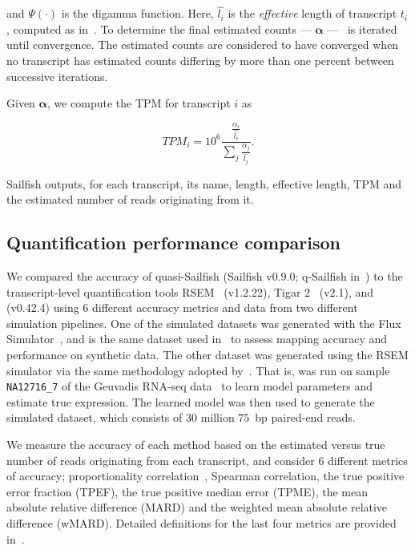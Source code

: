and $\Psi(\cdot)$ is the digamma function. Here, $\hat{l_i}$ is the \textit{effective} length of transcript $t_i$, computed as in~\citet{li2010rna}.  To determine the final estimated counts --- $\bm{\alpha}$ ---~ is iterated until convergence.  The estimated counts are considered to have converged when no transcript has estimated counts differing by more than one percent between successive iterations.

Given $\bm{\alpha}$, we compute the TPM for transcript $i$ as

\begin{equation}
  TPM_i = 10^6 \frac{\frac{\alpha_i}{\hat{l_i}}}{\sum_{j}\frac{\alpha_j}{\hat{l_j}}}.
\label{eqn:tpm}
\end{equation}

Sailfish outputs, for each transcript, its name, length, effective length, TPM and the estimated number of reads originating from it.

\subsection{Quantification performance comparison}
\label{subsec:quant_compare}

We compared the accuracy of quasi-Sailfish (Sailfish v0.9.0; q-Sailfish in~) to the transcript-level quantification tools RSEM~\citep{li2010rna} (v1.2.22), Tigar 2~\citep{tigar2} (v2.1), and \kallisto~\citep{Bray:2015:Kallisto} (v0.42.4) using 6 different accuracy metrics and data from two different simulation pipelines. One of the simulated datasets was generated with the Flux Simulator~\citep{fluxsim}, and is the same dataset used in~ to assess mapping accuracy and performance on synthetic data.  The other dataset was generated using the RSEM simulator via the same methodology adopted by~\citet{Bray:2015:Kallisto}.  That is,  was run on sample \texttt{NA12716\_7} of the Geuvadis RNA-seq data~\citep{Lappalainen2013Transcriptome} to learn model parameters and estimate true expression. The learned model was then used to generate the simulated dataset, which consists of $30$ million $75$~bp paired-end reads.

We measure the accuracy of each method based on the estimated versus true number of reads originating from each transcript, and consider 6 different metrics of accuracy; proportionality correlation~\citep{Lovell2015Proportionality}, Spearman correlation, the true positive error fraction (TPEF), the true positive median error (TPME), the mean absolute relative difference (MARD) and the weighted mean absolute relative difference (wMARD). Detailed definitions for the last four metrics are provided in~. 

